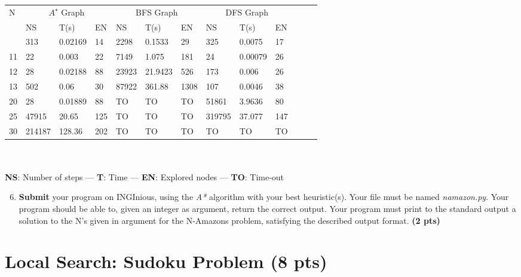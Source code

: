 \documentclass[11pt,a4paper]{report}
\begin{document}
\begin{answers}[6.5cm]
	\begin{center}
		\begin{tabular}{||l||l|l|l||l|l|l||l|l|l||l|l|l||}
		\hline
		\multirow{3}{*}{N} & \multicolumn{3}{c||}{$A^{\star}$ Graph}& \multicolumn{3}{c||}{BFS Graph} & \multicolumn{3}{c||}{DFS Graph}\\
		& NS & T(s) & EN & NS & T(s) & EN & NS & T(s) & EN\\
		\hline
		10 & 313 & 0.02169 & 14 & 2298 & 0.1533 & 29 & 325 & 0.0075 & 17 \\
		\hline
		11 & 22 & 0.003 & 22 & 7149 & 1.075 & 181 & 24 & 0.00079 & 26\\
		\hline
		12 & 28 & 0.02188 & 88 & 23923 & 21.9423 & 526 & 173 & 0.006 & 26 \\
		\hline
		13 & 502 & 0.06 & 30 & 87922 & 361.88 & 1308 & 107 & 0.0046 & 38 \\
		\hline
		20 & 28 & 0.01889 & 88 & TO & TO & TO & 51861 & 3.9636 & 80\\
		\hline
		25 & 47915 & 20.65 & 125 & TO & TO & TO & 319795 & 37.077 & 147\\
		\hline
		30 & 214187 & 128.36 & 202 & TO & TO & TO & TO & TO & TO\\
		\hline
		\end{tabular}\\
	~\\
	\textbf{NS}: Number of steps — \textbf{T}: Time — \textbf{EN}: Explored nodes — \textbf{TO}: Time-out
	\end{center}
\end{answers}



\begin{enumerate}
\setcounter{enumi}{5}
\item \textbf{Submit} your program on INGInious, using the \textit{A*} algorithm with your best heuristic(s).
		 Your file must be named \emph{namazon.py}. 
      Your program should be able to, given an integer as argument, return the correct output.
		 Your program must print to the standard output a solution to the N's given in argument for the N-Amazons problem, satisfying the described output format. \textbf{(2 pts)}
\end{enumerate}

\begin{answer}
\end{answer}

\section{Local Search: Sudoku Problem (8 pts)}
\end{document}
